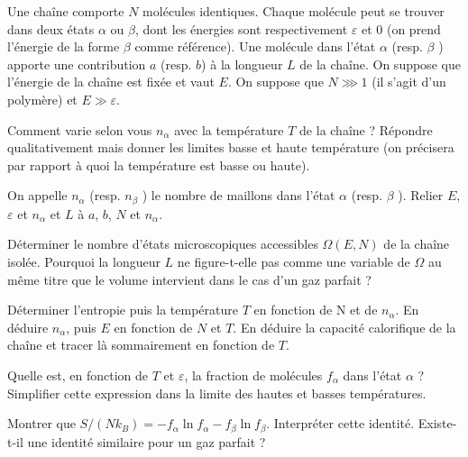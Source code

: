 \documentclass[utf8, 11pt]{feuille}
\begin{document}
Une chaîne comporte $N$ molécules identiques. Chaque molécule peut se trouver dans deux états $\alpha$
ou $\beta$, dont les énergies sont respectivement $\varepsilon$ et 0 (on prend l’énergie de la forme $\beta$ comme référence). Une molécule dans l’état $\alpha$ (resp. $\beta$ ) apporte une contribution $a$ (resp. $b$) à la longueur $L$ de la chaîne. On suppose que l’énergie de la chaîne est fixée et vaut $E$. On suppose que $N \ggg 1$ (il s'agit d'un polymère) et $E \gg \varepsilon$.

\question
Comment varie selon vous $n_{\alpha}$ avec la température $T$ de la chaîne ? Répondre qualitativement mais donner les limites basse et haute température (on précisera par rapport à quoi la température est basse ou haute).

\question
On appelle $n_{\alpha}$ (resp. $n_{\beta}$ ) le nombre de maillons dans l’état $\alpha$ (resp. $\beta$ ). Relier $E$, $\varepsilon$ et $n_{\alpha}$ et $L$ à $a$, $b$, $N$ et $n_{\alpha}$.


\question
Déterminer le nombre d'états microscopiques accessibles $\Omega(E, N)$ de la chaîne isolée. Pourquoi la longueur
$L$ ne figure-t-elle pas comme une variable de $\Omega$ au même titre que le volume intervient dans le cas d’un gaz parfait ?



\question
Déterminer l'entropie puis la température $T$ en fonction de N et de $n_{\alpha}$. En déduire $n_{\alpha}$, puis $E$ en fonction de $N$ et $T$. En déduire la capacité calorifique de la chaîne et tracer là sommairement en fonction de $T$.

\question Quelle est, en fonction de $T$ et $\varepsilon$, la fraction de molécules $f_{\alpha}$ dans l’état $\alpha$ ? Simplifier cette expression dans la limite des hautes et basses températures.

\question
Montrer que $S/(N k_B) = - f_{\alpha} \ln f_{\alpha} - f_{\beta} \ln f_{\beta}$. Interpréter cette identité. Existe-t-il une identité similaire pour un gaz parfait ?





\end{document}
